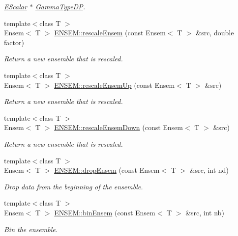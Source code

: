 \begin{DoxyCompactItemize}
\begin{DoxyCompactList}\small\item\em \mbox{\hyperlink{classENSEM_1_1EScalar}{E\+Scalar}} $\ast$ \mbox{\hyperlink{classENSEM_1_1GammaTypeDP}{Gamma\+Type\+DP}}. \end{DoxyCompactList}\item 
{\footnotesize template$<$class T $>$ }\\Ensem$<$ T $>$ \mbox{\hyperlink{group__eensem_gadbb88f64cff72d8d368551b6de6753f9}{E\+N\+S\+E\+M\+::rescale\+Ensem}} (const Ensem$<$ T $>$ \&src, double factor)
\begin{DoxyCompactList}\small\item\em Return a new ensemble that is rescaled. \end{DoxyCompactList}\item 
{\footnotesize template$<$class T $>$ }\\Ensem$<$ T $>$ \mbox{\hyperlink{group__eensem_ga30c22a7d0685364385ca870e38bd9b3b}{E\+N\+S\+E\+M\+::rescale\+Ensem\+Up}} (const Ensem$<$ T $>$ \&src)
\begin{DoxyCompactList}\small\item\em Return a new ensemble that is rescaled. \end{DoxyCompactList}\item 
{\footnotesize template$<$class T $>$ }\\Ensem$<$ T $>$ \mbox{\hyperlink{group__eensem_gae1ec6cc73aa72bf1f07360fa333487fe}{E\+N\+S\+E\+M\+::rescale\+Ensem\+Down}} (const Ensem$<$ T $>$ \&src)
\begin{DoxyCompactList}\small\item\em Return a new ensemble that is rescaled. \end{DoxyCompactList}\item 
{\footnotesize template$<$class T $>$ }\\Ensem$<$ T $>$ \mbox{\hyperlink{group__eensem_gae6658352073b607eb80030d2c69e5383}{E\+N\+S\+E\+M\+::drop\+Ensem}} (const Ensem$<$ T $>$ \&src, int nd)
\begin{DoxyCompactList}\small\item\em Drop data from the beginning of the ensemble. \end{DoxyCompactList}\item 
{\footnotesize template$<$class T $>$ }\\Ensem$<$ T $>$ \mbox{\hyperlink{group__eensem_ga26ac0e4150e2c67b69a13b6965beb29f}{E\+N\+S\+E\+M\+::bin\+Ensem}} (const Ensem$<$ T $>$ \&src, int nb)
\begin{DoxyCompactList}\small\item\em Bin the ensemble. \end{DoxyCompactList}\item 

\end{DoxyCompactItemize}

